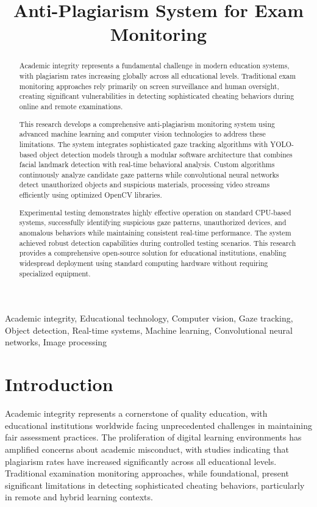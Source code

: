 \documentclass[conference]{IEEEtran}
\title{Anti-Plagiarism System for Exam Monitoring}
\author{
    \IEEEauthorblockN{Valentin Pletea-Marinescu}
    \IEEEauthorblockA{
        \textit{National University of Science and Technology POLITEHNICA Bucharest}\\
        Email: \texttt{pletea.valentin2003@gmail.com}
    }
}
\begin{document}
\maketitle

\begin{abstract}
Academic integrity represents a fundamental challenge in modern education systems, with plagiarism rates increasing globally across all educational levels. Traditional exam monitoring approaches rely primarily on screen surveillance and human oversight, creating significant vulnerabilities in detecting sophisticated cheating behaviors during online and remote examinations.

This research develops a comprehensive anti-plagiarism monitoring system using advanced machine learning and computer vision technologies to address these limitations. The system integrates sophisticated gaze tracking algorithms with YOLO-based object detection models through a modular software architecture that combines facial landmark detection with real-time behavioral analysis. Custom algorithms continuously analyze candidate gaze patterns while convolutional neural networks detect unauthorized objects and suspicious materials, processing video streams efficiently using optimized OpenCV libraries.

Experimental testing demonstrates highly effective operation on standard CPU-based systems, successfully identifying suspicious gaze patterns, unauthorized devices, and anomalous behaviors while maintaining consistent real-time performance. The system achieved robust detection capabilities during controlled testing scenarios. This research provides a comprehensive open-source solution for educational institutions, enabling widespread deployment using standard computing hardware without requiring specialized equipment.
\end{abstract}

\begin{IEEEkeywords}
Academic integrity, Educational technology, Computer vision, Gaze tracking, Object detection, Real-time systems, Machine learning, Convolutional neural networks, Image processing
\end{IEEEkeywords}

\section{Introduction}

Academic integrity represents a cornerstone of quality education, with educational institutions worldwide facing unprecedented challenges in maintaining fair assessment practices. The proliferation of digital learning environments has amplified concerns about academic misconduct, with studies indicating that plagiarism rates have increased significantly across all educational levels\cite{zimba2021plagiarism}. Traditional examination monitoring approaches, while foundational, present significant limitations in detecting sophisticated cheating behaviors, particularly in remote and hybrid learning contexts.
\end{document}
